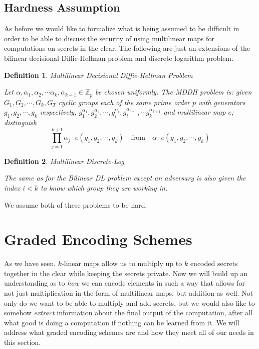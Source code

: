 \documentclass[12pt,twoside]{reedthesis}
\newtheorem{definition}{Definition}
\newcommand{\Z}[0]{\mathbb{Z}}
\begin{document}
 \subsection{Hardness Assumption}
 
 As before we would like to formalize what is being assumed to be difficult in order to be able to discuss the security of using multilinear maps for computations on secrets in the clear. The following are just an extensions of the bilinear decisional Diffie-Hellman problem and discrete logarithm problem.
 
 
 \begin{definition}{Multilinear Decisional Diffie-Hellman Problem} 
\par Let $\alpha,\alpha_1,\alpha_2,\cdots \alpha_k, \alpha_{k+1} \in \Z_p$ be chosen uniformly. The MDDH problem is: given $G_1,G_2, \cdots, G_k,G_T$ cyclic groups each of the same prime order $p$ with generators $g_1,g_2,\cdots, g_k$ respectively, $g_1^{\alpha_1}, g_2^{\alpha_2}, \cdots, g_i^{\alpha_i} , g_i^{\alpha_{i+1}},\cdots g_k^{\alpha_{k+1}}$ and multilinear map $e$; distinguish 
$$\prod_{j=1}^{k+1}\alpha_j \cdot e(g_1,g_2,\cdots,g_k)  \quad \text{from} \quad \alpha \cdot e(g_1,g_2,\cdots ,g_k)$$
 \end{definition}    
 
  \begin{definition}{Multilinear Discrete-Log} \par
 The same as for the Bilinear DL problem except an adversary is also given the index $i<k$ to know which group they are working in.
 \end{definition}
  

\par We assume both of these problems to be hard.

            
    
    \section{Graded Encoding Schemes}
    
    As we have seen, $k$-linear maps allow us to multiply up to $k$ encoded secrets together in the clear while keeping the secrets private. Now we will build up an understanding as to \textit{how} we can encode elements in such a way that allows for not just multiplication in the form of multilinear maps, but addition as well. Not only do we want to be able to multiply and add secrets, but we would also like to somehow \textit{extract} information about the final output of the computation, after all what good is doing a computation if nothing can be learned from it. We will address what graded encoding schemes are and how they meet all of our needs in this section. 
      
\end{document}
